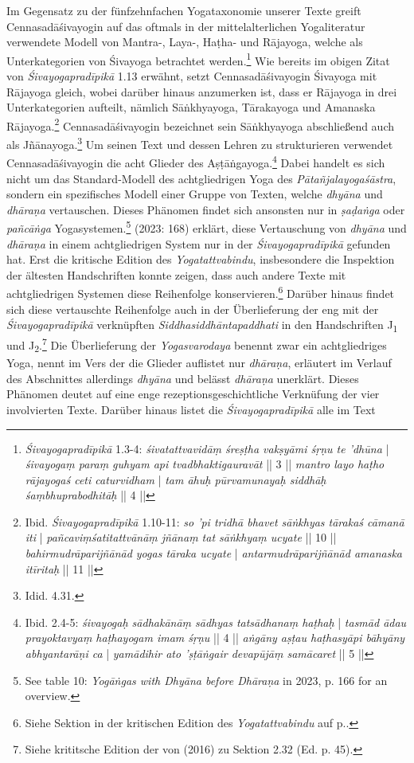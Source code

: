 Im Gegensatz zu der fünfzehnfachen Yogataxonomie unserer Texte greift Cennasadāśivayogin auf das oftmals in der mittelalterlichen Yogaliteratur verwendete Modell von Mantra-, Laya-, Haṭha- und Rājayoga, welche als Unterkategorien von Śivayoga betrachtet werden.\footnote{\textit{Śivayogapradīpikā} 1.3-4: \textit{śivatattvavidāṃ śreṣṭha vakṣyāmi śṛṇu te 'dhūna} | \textit{śivayogaṃ paraṃ guhyam api tvadbhaktigauravāt} || 3 || \textit{mantro layo haṭho rājayogaś ceti caturvidham} | \textit{tam āhuḥ pūrvamunayaḥ siddhāḥ śaṃbhuprabodhitāḥ} || 4 ||} Wie bereits im obigen Zitat von \textit{Śivayogapradīpikā} 1.13 erwähnt, setzt Cennasadāśivayogin Śivayoga mit Rājayoga gleich, wobei darüber hinaus anzumerken ist, dass er Rājayoga in drei Unterkategorien aufteilt, nämlich Sāṅkhyayoga, Tārakayoga und Amanaska Rājayoga.\footnote{Ibid. \textit{Śivayogapradīpikā} 1.10-11: \textit{so 'pi tridhā bhavet sāṅkhyas tārakaś cāmanā iti} | \textit{pañcaviṃśatitattvānāṃ jñānaṃ tat sāṅkhyaṃ ucyate} || 10 || \textit{bahirmudrāparijñānād yogas tāraka ucyate} | \textit{antarmudrāparijñānād amanaska itīritaḥ} || 11 ||} Cennasadāśivayogin bezeichnet sein Sāṅkhyayoga abschließend auch als Jñānayoga.\footnote{Idid. 4.31.} Um seinen Text und dessen Lehren zu strukturieren verwendet Cennasadāśivayogin die acht Glieder des Aṣṭāṅgayoga.\footnote{Ibid. 2.4-5: \textit{śivayogaḥ sādhakānāṃ sādhyas tatsādhanaṃ haṭhaḥ} | \textit{tasmād ādau prayoktavyaṃ haṭhayogam imam śṛṇu} || 4 || \textit{aṅgāny aṣṭau haṭhasyāpi bāhyāny abhyantarāṇi ca} | \textit{yamādihir ato 'ṣṭāṅgair devapūjāṃ samācaret} || 5 ||} Dabei handelt es sich nicht um das Standard-Modell des achtgliedrigen Yoga des \textit{Pātañjalayogaśāstra}, sondern ein spezifisches Modell einer Gruppe von Texten, welche \textit{dhyāna} und \textit{dhāraṇa} vertauschen. Dieses Phänomen findet sich ansonsten nur in \textit{ṣaḍaṅga} oder \textit{pañcāṅga} Yogasystemen.\footnote{See table 10: \textit{Yogāṅgas with Dhyāna before Dhāraṇa} in \citeauthor{powell2023} 2023, p. 166 for an overview.} \citeauthor{powell2023} (2023: 168) erklärt, diese Vertauschung von \textit{dhyāna} und \textit{dhāraṇa} in einem achtgliedrigen System nur in der \textit{Śivayogapradīpikā} gefunden hat. Erst die kritische Edition des \textit{Yogatattvabindu}, insbesondere die Inspektion der ältesten Handschriften konnte zeigen, dass auch andere Texte mit achtgliedrigen Systemen diese Reihenfolge konservieren.\footnote{Siehe Sektion  in der kritischen Edition des \textit{Yogatattvabindu} auf p.\pageref{ashtanga}.} Darüber hinaus findet sich diese vertauschte Reihenfolge auch in der Überlieferung der eng mit der \textit{Śivayogapradīpikā} verknüpften \textit{Siddhasiddhāntapaddhati} in den Handschriften J\textsubscript{1} und J\textsubscript{2}.\footnote{Siehe krititsche Edition der  von \citeauthor{ssplonavla} (2016) zu Sektion 2.32 (Ed. p. 45).} Die Überlieferung der \textit{Yogasvarodaya} benennt zwar ein achtgliedriges Yoga, nennt im Vers der die Glieder auflistet nur \textit{dhāraṇa}, erläutert im Verlauf des Abschnittes allerdings \textit{dhyāna} und belässt \textit{dhāraṇa} unerklärt. Dieses Phänomen deutet auf eine enge rezeptionsgeschichtliche Verknüfung der vier involvierten Texte. Darüber hinaus listet die \textit{Śivayogapradīpikā} alle im Text 